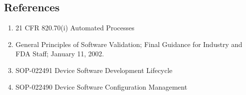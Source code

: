 \subsection{References}
\begin{enumerate}
\item 21 CFR 820.70(i) Automated Processes
\item General Principles of Software Validation; Final Guidance for Industry and FDA Staff; January 11, 2002.
\item SOP-022491 Device Software Development Lifecycle
\item SOP-022490 Device Software Configuration Management
\end{enumerate}
